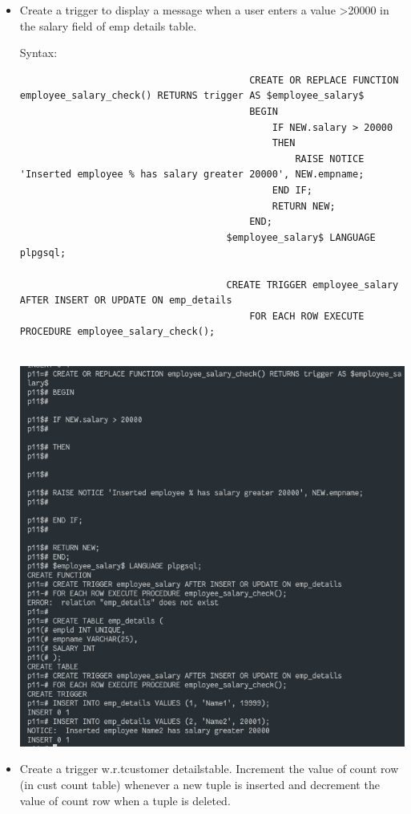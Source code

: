 \documentclass[13pt,oneside]{book}
\begin{document}
\begin{itemize}
									
									\item
									Create a trigger to display a message when a user enters a value >20000
									in the salary field of emp details table.
									 
									Syntax:
									\begin{verbatim}
										CREATE OR REPLACE FUNCTION employee_salary_check() RETURNS trigger AS $employee_salary$
										BEGIN
											IF NEW.salary > 20000 
											THEN
												RAISE NOTICE 'Inserted employee % has salary greater 20000', NEW.empname;
											END IF;
											RETURN NEW;
										END;
									$employee_salary$ LANGUAGE plpgsql;
									
									CREATE TRIGGER employee_salary AFTER INSERT OR UPDATE ON emp_details
										FOR EACH ROW EXECUTE PROCEDURE employee_salary_check();
								
									\end{verbatim}
									\includegraphics[]{img/p10/ss2.png}
									
									
									\item
									Create a trigger w.r.tcustomer detailstable.
								Increment the value of count row (in cust count table) whenever a new tuple is 
								inserted and decrement the value of count row when a tuple is deleted.
									 

\end{itemize}
\end{document}
